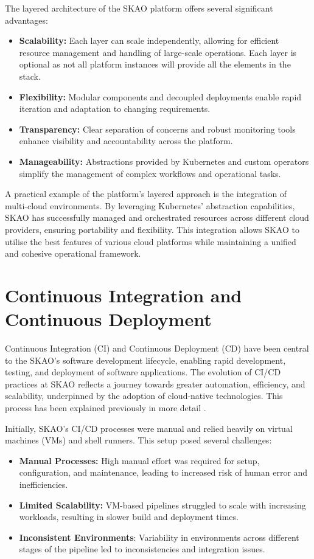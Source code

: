 \documentclass[a4paper]{spie}  %
\begin{document}
The layered architecture of the SKAO platform offers several significant advantages:

\begin{itemize}
    \item \textbf{Scalability:} Each layer can scale independently, allowing for efficient resource management and handling of large-scale operations. Each layer is optional as not all platform instances will provide all the elements in the stack.
    \item \textbf{Flexibility:} Modular components and decoupled deployments enable rapid iteration and adaptation to changing requirements.
    \item \textbf{Transparency:} Clear separation of concerns and robust monitoring tools enhance visibility and accountability across the platform.
    \item \textbf{Manageability:} Abstractions provided by Kubernetes and custom operators simplify the management of complex workflows and operational tasks.
\end{itemize}

A practical example of the platform's layered approach is the integration of multi-cloud environments. By leveraging Kubernetes' abstraction capabilities, SKAO has successfully managed and orchestrated resources across different cloud providers, ensuring portability and flexibility. This integration allows SKAO to utilise the best features of various cloud platforms while maintaining a unified and cohesive operational framework.

\section{Continuous Integration and Continuous Deployment}

Continuous Integration (CI) and Continuous Deployment (CD) have been central to the SKAO’s software development lifecycle, enabling rapid development, testing, and deployment of software applications. The evolution of CI/CD practices at SKAO reflects a journey towards greater automation, efficiency, and scalability, underpinned by the adoption of cloud-native technologies. This process has been explained previously in more detail \cite{di_carlo_ci-cd_2020, yilmaz_driving_2023, team_skao_2024}. 

Initially, SKAO's CI/CD processes were manual and relied heavily on virtual machines (VMs) and shell runners. This setup posed several challenges:

\begin{itemize}
    \item \textbf{Manual Processes:} High manual effort was required for setup, configuration, and maintenance, leading to increased risk of human error and inefficiencies.
    \item \textbf{Limited Scalability:} VM-based pipelines struggled to scale with increasing workloads, resulting in slower build and deployment times.
    \item \textbf{Inconsistent Environments}: Variability in environments across different stages of the pipeline led to inconsistencies and integration issues.
\end{itemize}
\end{document}
